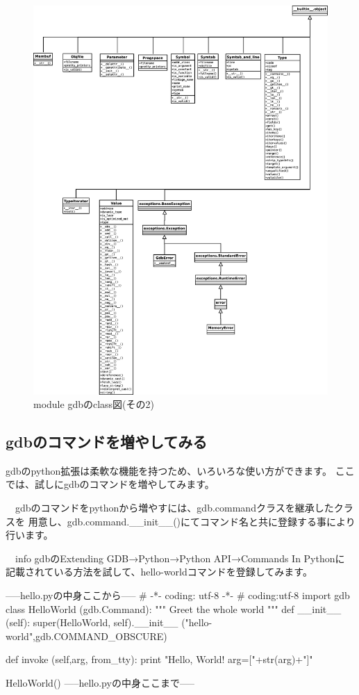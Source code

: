 \documentclass[mingoth,a4paper]{jsarticle}
\begin{document}
\begin{figure}[h]
\begin{center}
 \includegraphics[width=0.8\hsize]{image201301/gdb-python/gdb-python-class-schema-2.eps}
 \caption{module gdbのclass図(その2)}
 \label{fig:python-class-schema-2}
\end{center}
\end{figure}

\newpage

\subsection{gdbのコマンドを増やしてみる}

 gdbのpython拡張は柔軟な機能を持つため、いろいろな使い方ができます。
ここでは、試しにgdbのコマンドを増やしてみます。

　gdbのコマンドをpythonから増やすには、gdb.commandクラスを継承したクラスを
用意し、gdb.command.\_\_init\_\_()にてコマンド名と共に登録する事により行います。

　info gdbのExtending GDB→Python→Python API→Commands In Pythonに
記載されている方法を試して、hello-worldコマンドを登録してみます。

\begin{commandline}
-----hello.pyの中身ここから-----
# -*- coding: utf-8 -*-
# coding:utf-8
import gdb
class HelloWorld (gdb.Command):
  """ Greet the whole world """
  def __init__ (self):
     super(HelloWorld, self).__init__ ("hello-world",gdb.COMMAND_OBSCURE)

  def invoke (self,arg, from_tty):
     print "Hello, World! arg=["+str(arg)+"]"

HelloWorld()
-----hello.pyの中身ここまで-----
\end{commandline}
\end{document}
